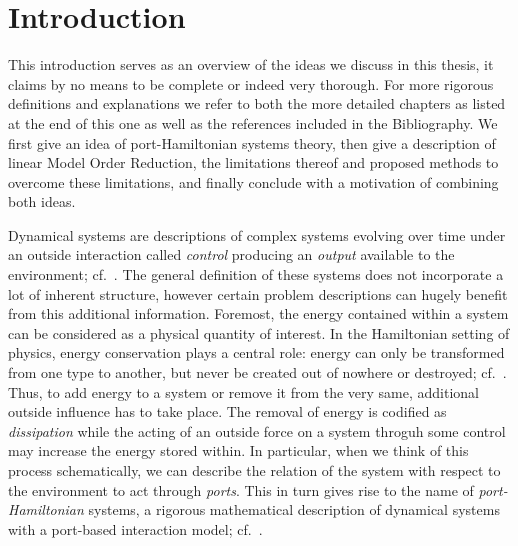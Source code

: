 \chapter{Introduction}

This introduction serves as an overview of the ideas we discuss in this thesis, it claims by no means to be complete or indeed very thorough.
For more rigorous definitions and explanations we refer to both the more detailed chapters as listed at the end of this one as well as the references included in the Bibliography.
We first give an idea of port-Hamiltonian systems theory, then give a description of linear Model Order Reduction, the limitations thereof and proposed methods to overcome these limitations, and finally conclude with a motivation of combining both ideas.

Dynamical systems are descriptions of complex systems evolving over time under an outside interaction called \emph{control} producing an \emph{output} available to the environment; cf.~\cite{Hinrichsen2005}.
The general definition of these systems does not incorporate a lot of inherent structure, however certain problem descriptions can hugely benefit from this additional information.
Foremost, the energy contained within a system can be considered as a physical quantity of interest.
In the Hamiltonian setting of physics, energy conservation plays a central role: energy can only be transformed from one type to another, but never be created out of nowhere or destroyed; cf.~\cite{Taylor2005, Giorgilli2022}.
Thus, to add energy to a system or remove it from the very same, additional outside influence has to take place.
The removal of energy is codified as \emph{dissipation} while the acting of an outside force on a system throguh some control may increase the energy stored within.
In particular, when we think of this process schematically, we can describe the relation of the system with respect to the environment to act through \emph{ports}.
This in turn gives rise to the name of \emph{port-Hamiltonian} systems, a rigorous mathematical description of dynamical systems with a port-based interaction model; cf.~\cite{Duindam2009, Jacob2012, VanDerSchaft2014, Mehrmann2022}.

